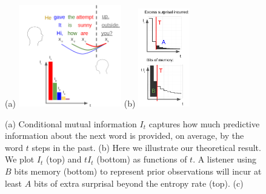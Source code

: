 \begin{figure}
	(a)
\includegraphics[width=0.4\textwidth]{figures-gdrive/mi-distance.png}
	(b)
\includegraphics[width=0.2\textwidth]{figures-gdrive/theorem.png}
	\caption{
		(a) Conditional mutual information $I_t$ captures how much predictive information about the next word is provided, on average, by the word $t$ steps in the past.
		(b) Here we illustrate our theoretical result. We plot $I_t$ (top) and $tI_t$ (bottom) as functions of $t$. A listener using $B$ bits memory (bottom) to represent prior observations will incur at least $A$ bits of extra surprisal beyond the entropy rate (top). 
		(c)  
}\label{fig:theorem}
\end{figure}













